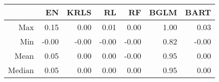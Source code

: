 \begin{table}[ht]
\centering
\begin{tabular}{rrrrrrr}
  \hline
 & EN & KRLS & RL & RF & BGLM & BART \\ 
  \hline
Max & 0.15 & 0.00 & 0.01 & 0.00 & 1.00 & 0.03 \\ 
  Min & -0.00 & -0.00 & -0.00 & -0.00 & 0.82 & -0.00 \\ 
  Mean & 0.05 & 0.00 & 0.00 & -0.00 & 0.95 & 0.00 \\ 
  Median & 0.05 & 0.00 & 0.00 & 0.00 & 0.95 & 0.00 \\ 
   \hline
\end{tabular}
\end{table}
